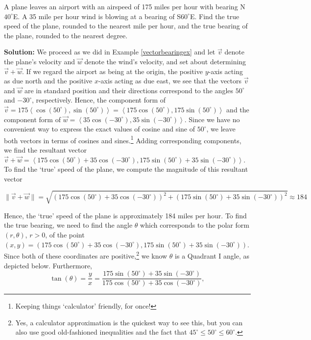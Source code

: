 \begin{ex} \label{vectorbearingexresolve}  A plane leaves an airport with an airspeed of 175 miles per hour with bearing N$40^{\circ}$E.  A 35 mile per hour wind is blowing at a bearing of S$60^{\circ}$E.  Find the true speed of the plane, rounded to the nearest mile per hour,  and the true bearing of the plane, rounded to the nearest degree.

{\bf Solution:}  We proceed as we did in Example \ref{vectorbearingex} and let $\vec{v}$ denote the plane's velocity and $\vec{w}$ denote the wind's velocity, and set about determining $\vec{v} + \vec{w}$.  If we regard the airport as being at the origin, the positive $y$-axis acting as due north and the positive $x$-axis acting as due east, we see that the vectors $\vec{v}$ and $\vec{w}$ are in standard position and their directions correspond to the angles $50^{\circ}$ and $-30^{\circ}$, respectively.  Hence, the component form of $\vec{v} = 175\left<\cos(50^{\circ}), \sin(50^{\circ})\right> = \left<175\cos(50^{\circ}), 175\sin(50^{\circ})\right>$ and the component form of $\vec{w} = \left<35\cos(-30^{\circ}), 35\sin(-30^{\circ}) \right>$.  Since we have no convenient way to express the exact values of cosine and sine of $50^{\circ}$, we leave both vectors in terms of cosines and sines.\footnote{Keeping things `calculator' friendly, for once!}  Adding corresponding components, we find the resultant vector $\vec{v} + \vec{w} = \left< 175\cos(50^{\circ}) + 35\cos(-30^{\circ}), 175\sin(50^{\circ}) + 35\sin(-30^{\circ})\right>$.  To find the `true' speed of the plane, we compute the magnitude of this resultant vector

\[ \| \vec{v} + \vec{w}\| = \sqrt{ (175\cos(50^{\circ}) + 35\cos(-30^{\circ}))^2 + (175\sin(50^{\circ}) + 35\sin(-30^{\circ}))^2} \approx 184\]

Hence, the `true' speed of the plane is approximately 184 miles per hour.  To find the true bearing, we need to find the angle $\theta$ which corresponds to the polar form $(r,\theta)$, $r>0$, of the point $(x,y) = (175\cos(50^{\circ}) + 35\cos(-30^{\circ}), 175\sin(50^{\circ}) + 35\sin(-30^{\circ}))$.  Since both of these coordinates are positive,\footnote{Yes, a calculator approximation is the quickest way to see this, but you can also use good old-fashioned inequalities and the fact that $45^{\circ} \leq 50^{\circ} \leq 60^{\circ}$.} we know $\theta$ is a Quadrant I angle, as depicted below.  Furthermore, \[\tan(\theta) = \frac{y}{x} = \frac{175\sin(50^{\circ}) + 35\sin(-30^{\circ})}{175\cos(50^{\circ}) + 35\cos(-30^{\circ})},\]


\end{ex}
